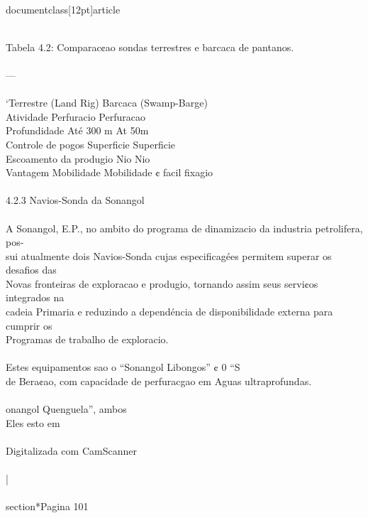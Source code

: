 \\documentclass[12pt]{article}
\begin{document}
\\
Tabela 4.2: Comparac¢ao sondas terrestres e barcaca de pantanos.\\
\\
—\\
\\
‘Terrestre (Land Rig) Barcaca (Swamp-Barge)\\
Atividade Perfuracio Perfuracao\\
Profundidade Até 300 m At 50m\\
Controle de pogos Superficie Superficie\\
Escoamento da produgio Nio Nio\\
Vantagem Mobilidade Mobilidade ¢ facil fixagio\\
\\
4.2.3 Navios-Sonda da Sonangol\\
\\
A Sonangol, E.P., no ambito do programa de dinamizacio da industria petrolifera, pos-\\
sui atualmente dois Navios-Sonda cujas especificagées permitem superar os desafios das\\
Novas fronteiras de exploracao e produgio, tornando assim seus servi¢os integrados na\\
cadeia Primaria e reduzindo a dependéncia de disponibilidade externa para cumprir os\\
Programas de trabalho de exploracio.\\
\\
Estes equipamentos sao o “Sonangol Libongos” ¢ 0 “S\\
de Bera¢ao, com capacidade de perfuracgao em Aguas ultraprofundas.\\
\\
onangol Quenguela”, ambos\\
Eles esto em\\
\\
Digitalizada com CamScanner\\
\\
|\\

\\section*{Pagina 101}
\end{document}
